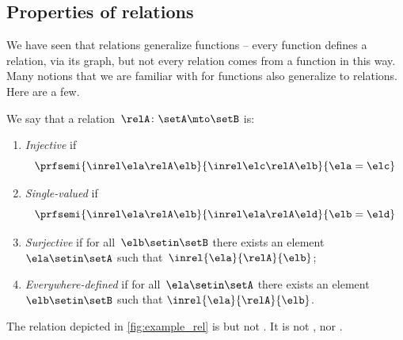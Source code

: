 

\subsection{Properties of relations}

We have seen that relations generalize functions -- every function defines a relation, via its graph, but not every relation comes from a function in this way.
Many notions that we are familiar with for functions also generalize to relations.
Here are a few.

\begin{ctdefinition}
    \label{def:rel_properties}
    We say that a relation~$\relA \colon \setA \mto \setB$ is:
    \begin{enumerate}
        \item \label{def:injective-relation} \emph{Injective} if
              \begin{equation}
                  \prfsemi{
                      \inrel \ela \relA \elb
                  }{
                      \inrel \elc \relA \elb
                  }{
                      \ela=\elc
                  }
              \end{equation}
        \item \label{def:single-valued-relation} \emph{Single-valued} if
              \begin{equation}
                  \prfsemi{
                      \inrel \ela \relA \elb
                  }{
                      \inrel \ela \relA \eld
                  }{
                      \elb = \eld
                  }
              \end{equation}
        \item \label{def:surjective-relation} \emph{Surjective} if for all~$\elb\setin \setB$ there exists an element~$\ela\setin \setA$ such that~$\inrel{\ela}{\relA}{\elb}$;
        \item \label{def:everywhere-defined-relation} \emph{Everywhere-defined} if for all~$\ela\setin \setA$ there exists an element~$\elb \setin \setB$ such that $\inrel{\ela}{\relA}{\elb}$.
    \end{enumerate}
\end{ctdefinition}

\begin{example}
    The relation depicted in \cref{fig:example_rel} is  but not .
    It is not , nor .
\end{example}

